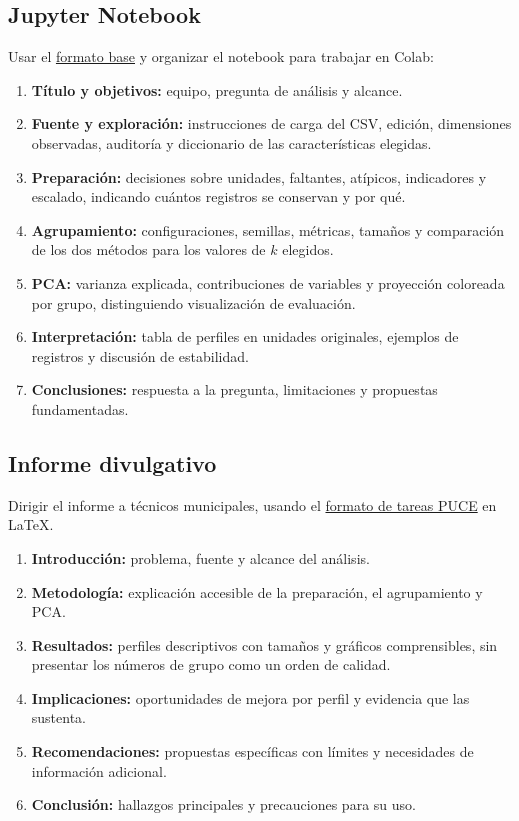 \documentclass[a4,11pt]{aleph-notas}
\begin{document}
\subsection{Jupyter Notebook}
Usar el \href{https://github.com/andres-merino/FormatoBaseProyectos/blob/main/Plantilla.ipynb}{formato base} y organizar el notebook para trabajar en Colab:
\begin{enumerate}[leftmargin=*, label={\textbf{\arabic*.}}]
    \item \textbf{Título y objetivos:} equipo, pregunta de análisis y alcance.
    \item \textbf{Fuente y exploración:} instrucciones de carga del CSV, edición, dimensiones observadas, auditoría y diccionario de las características elegidas.
    \item \textbf{Preparación:} decisiones sobre unidades, faltantes, atípicos, indicadores y escalado, indicando cuántos registros se conservan y por qué.
    \item \textbf{Agrupamiento:} configuraciones, semillas, métricas, tamaños y comparación de los dos métodos para los valores de $k$ elegidos.
    \item \textbf{PCA:} varianza explicada, contribuciones de variables y proyección coloreada por grupo, distinguiendo visualización de evaluación.
    \item \textbf{Interpretación:} tabla de perfiles en unidades originales, ejemplos de registros y discusión de estabilidad.
    \item \textbf{Conclusiones:} respuesta a la pregunta, limitaciones y propuestas fundamentadas.
\end{enumerate}

\subsection{Informe divulgativo}
Dirigir el informe a técnicos municipales, usando el \href{https://www.overleaf.com/latex/templates/formato-tareas-puce/nkgwqjtcrvms}{formato de tareas PUCE} en \LaTeX{}.
\begin{enumerate}[leftmargin=*, label={\textbf{\arabic*.}}]
    \item \textbf{Introducción:} problema, fuente y alcance del análisis.
    \item \textbf{Metodología:} explicación accesible de la preparación, el agrupamiento y PCA.
    \item \textbf{Resultados:} perfiles descriptivos con tamaños y gráficos comprensibles, sin presentar los números de grupo como un orden de calidad.
    \item \textbf{Implicaciones:} oportunidades de mejora por perfil y evidencia que las sustenta.
    \item \textbf{Recomendaciones:} propuestas específicas con límites y necesidades de información adicional.
    \item \textbf{Conclusión:} hallazgos principales y precauciones para su uso.
\end{enumerate}
\end{document}
